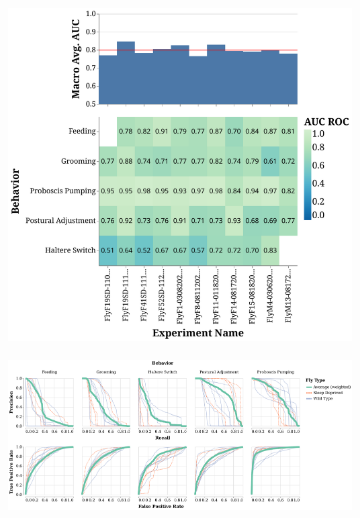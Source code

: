 \begin{figure}[ht!]
	\centering
	\begin{subfigure}[ht!]{0.675\linewidth}
		\centering\includegraphics[width=\linewidth]{figures/AUC_ROC-DActfiltered.pdf}
		\caption{}
	\end{subfigure}%

	\centering
	\begin{subfigure}[ht!]{0.9\linewidth}
		\centering\includegraphics[width=\linewidth]{figures/PRC_ROC-DActfiltered.pdf}
		\caption{}
	\end{subfigure}%
\end{figure}


